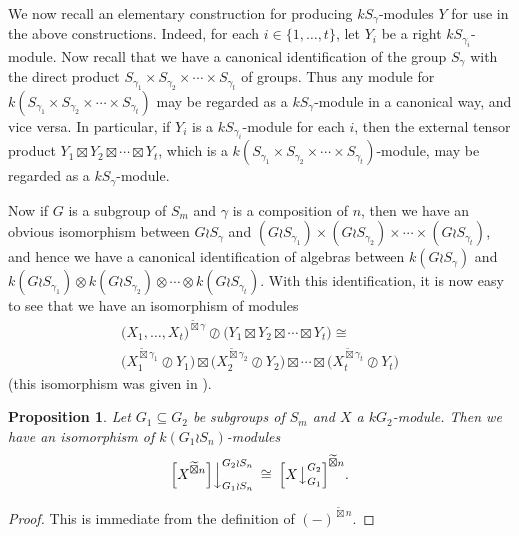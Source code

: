 \documentclass[10pt]{article}
\newtheorem{prop}[theorem]{Proposition}
\theoremstyle{definition}
\begin{document}
We now recall an elementary construction for producing $kS_{\gamma}$-modules $Y$ for use in the above constructions. Indeed, for each
$i \in \{1,\ldots,t\}$, let $Y_i$ be a right $kS_{\gamma_i}$-module. Now recall that we have a canonical identification of the group
$S_{\gamma}$ with the direct product $S_{\gamma_1}\times S_{\gamma_2}\times\cdots\times S_{\gamma_t}$ of groups. Thus any module for
$k(S_{\gamma_1}{\times}S_{\gamma_2}{\times}\cdots{\times}S_{\gamma_t})$ may be regarded as a $kS_{\gamma}$-module in a canonical way, and vice
versa. In particular, if $Y_i$ is a $kS_{\gamma_i}$-module for each $i$, then the external tensor product
$Y_1 \boxtimes Y_2 \boxtimes \cdots \boxtimes Y_t$, which is a
$k\left(S_{\gamma_1}\times S_{\gamma_2}\times\cdots\times S_{\gamma_t}\right)$-module, may be regarded as a $kS_{\gamma}$-module.

Now if $G$ is a subgroup of $S_m$ and $\gamma$ is a composition of $n$, then we have an obvious isomorphism between $G{\wr}S_{\gamma}$ and 
$\left(G{\wr}S_{\gamma_1}\right)\times\left(G{\wr}S_{\gamma_2}\right)\times\cdots\times\left(G{\wr}S_{\gamma_t}\right)$, and hence we have a
canonical identification of algebras between $k(G{\wr}S_{\gamma})$ and
$k\left(G{\wr}S_{\gamma_1}\right)\otimes k\left(G{\wr}S_{\gamma_2}\right)\otimes\cdots \otimes k\left(G{\wr}S_{\gamma_t}\right)$.
With this identification, it is now easy to see that we have an isomorphism of modules
\begin{multline}\label{mod_wprd_etp_vrs:eq}
\bigl(X_1,\ldots,X_t\bigr)^{\widetilde\boxtimes\gamma} {\oslash}\bigl(Y_1 \boxtimes Y_2 \boxtimes \cdots\boxtimes Y_t\bigr)
\cong\\
	\bigl(X_1^{\widetilde\boxtimes \gamma_1}\oslash Y_1\bigr)\boxtimes
	\bigl(X_2^{\widetilde\boxtimes \gamma_2}\oslash Y_2\bigr)\boxtimes\cdots
	\boxtimes\bigl(X_t^{\widetilde\boxtimes \gamma_t}\oslash Y_t\bigr)
\end{multline}
(this isomorphism was given in \cite[Lemma 3.2 (1)]{CHTAN}).

\begin{prop}\label{res_comm_tilde_boxtimes:prop}
Let $G_1 \subseteq G_2$ be subgroups of $S_m$ and $X$ a $kG_2$-module. Then we have an isomorphism of $k(G_1 \wr S_n)$-modules
\[
\Bigl[X^{\widetilde\boxtimes n}\Bigr]\Bigr\downarrow^{G_2 \wr S_n}_{G_1 \wr S_n} \:\cong\:
\Bigl[X\bigr\downarrow^{G_2}_{G_1}\Bigl]^{\widetilde\boxtimes n}.
\]
\end{prop}
\begin{proof}
This is immediate from the definition of $(-)^{\widetilde\boxtimes n}$.
\end{proof}
\end{document}
